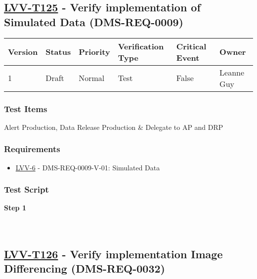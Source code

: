 \hypertarget{lvv-t125---verify-implementation-of-simulated-data-dms-req-0009}{%
\subsection{\texorpdfstring{\href{https://jira.lsstcorp.org/secure/Tests.jspa\#/testCase/LVV-T125}{LVV-T125}
- Verify implementation of Simulated Data
(DMS-REQ-0009)}{LVV-T125 - Verify implementation of Simulated Data (DMS-REQ-0009)}}\label{lvv-t125---verify-implementation-of-simulated-data-dms-req-0009}}

\begin{longtable}[]{@{}llllll@{}}
\toprule
Version & Status & Priority & Verification Type & Critical Event &
Owner\tabularnewline
\midrule
\endhead
1 & Draft & Normal & Test & False & Leanne Guy\tabularnewline
\bottomrule
\end{longtable}

\hypertarget{test-items-101}{%
\subsubsection{Test Items}\label{test-items-101}}

Alert Production, Data Release Production \& Delegate to AP and DRP

\hypertarget{requirements-102}{%
\subsubsection{Requirements}\label{requirements-102}}

\begin{itemize}
\tightlist
\item
  \href{https://jira.lsstcorp.org/browse/LVV-6}{LVV-6} -
  DMS-REQ-0009-V-01: Simulated Data
\end{itemize}

\hypertarget{test-script-102}{%
\subsubsection{Test Script}\label{test-script-102}}

\textbf{Step 1}\\
~\\
~\\

\hypertarget{lvv-t126---verify-implementation-image-differencing-dms-req-0032}{%
\subsection{\texorpdfstring{\href{https://jira.lsstcorp.org/secure/Tests.jspa\#/testCase/LVV-T126}{LVV-T126}
- Verify implementation Image Differencing
(DMS-REQ-0032)}{LVV-T126 - Verify implementation Image Differencing (DMS-REQ-0032)}}\label{lvv-t126---verify-implementation-image-differencing-dms-req-0032}}

